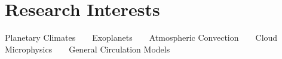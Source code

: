 \documentclass[a4paper, 11pt]{article}
\newcommand{\sep}{~~\textbullet~~}
\begin{document}
\thispagestyle{empty}

\keepXColumns



\section{Research Interests}
Planetary Climates\sep Exoplanets\sep Atmospheric Convection\sep Cloud Microphysics\sep General Circulation Models

\end{document}
